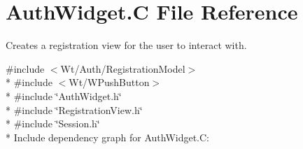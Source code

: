 \hypertarget{AuthWidget_8C}{}\section{Auth\+Widget.\+C File Reference}
\label{AuthWidget_8C}


Creates a registration view for the user to interact with.  


{\ttfamily \#include $<$Wt/\+Auth/\+Registration\+Model$>$}\\*
{\ttfamily \#include $<$Wt/\+W\+Push\+Button$>$}\\*
{\ttfamily \#include \char`\"{}Auth\+Widget.\+h\char`\"{}}\\*
{\ttfamily \#include \char`\"{}Registration\+View.\+h\char`\"{}}\\*
{\ttfamily \#include \char`\"{}Session.\+h\char`\"{}}\\*
Include dependency graph for Auth\+Widget.\+C\+:
